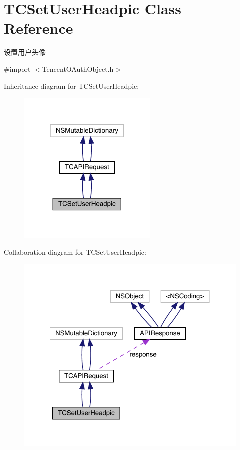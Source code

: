 \hypertarget{interface_t_c_set_user_headpic}{}\section{T\+C\+Set\+User\+Headpic Class Reference}
\label{interface_t_c_set_user_headpic}


设置用户头像  




{\ttfamily \#import $<$Tencent\+O\+Auth\+Object.\+h$>$}



Inheritance diagram for T\+C\+Set\+User\+Headpic\+:\nopagebreak
\begin{figure}[H]
\begin{center}
\leavevmode
\includegraphics[width=190pt]{interface_t_c_set_user_headpic__inherit__graph}
\end{center}
\end{figure}


Collaboration diagram for T\+C\+Set\+User\+Headpic\+:\nopagebreak
\begin{figure}[H]
\begin{center}
\leavevmode
\includegraphics[width=322pt]{interface_t_c_set_user_headpic__coll__graph}
\end{center}
\end{figure}
